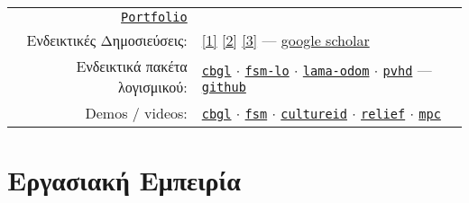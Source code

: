 \documentclass[a4paper,10pt,twoside]{article}
\begin{document}
\begin{tabular}{rp{12cm}}
  \href{https://raw.githubusercontent.com/li9i/portfolio/master/portfolio.pdf}{\texttt{Portfolio}} & \\

  Ενδεικτικές Δημοσιεύσεις:&
\href{https://ieeexplore.ieee.org/abstract/document/9981228}{[1]}
\href{https://www.sciencedirect.com/science/article/abs/pii/S0921889021002323}{[2]}
\href{https://www.tandfonline.com/doi/full/10.1080/00207179.2018.1514129}{[3]} --- \href{https://scholar.google.com/citations?view\_op=list\_works\&hl=en\&user=9\_hI4hMAAAAJ}{google scholar}\\

  Ενδεικτικά πακέτα λογισμικού: &
\href{https://github.com/li9i/cbgl}{\texttt{cbgl}} $\cdot$
\href{https://github.com/li9i/fsm-lo}{\texttt{fsm-lo}} $\cdot$
\href{https://github.com/li9i/lama-odom}{\texttt{lama-odom}} $\cdot$
\href{https://github.com/li9i/pandora\_vision\_2014/tree/hydro-devel/pandora\_vision\_hole\_detector}{\texttt{pvhd}} --- \href{https://github.com/li9i}{\texttt{github}}\\

  Demos / videos: & \href{https://www.youtube.com/watch?v=xaDKjI0WkDc}{\texttt{cbgl}} $\cdot$ \href{https://www.youtube.com/watch?v=hB4qsHCEXGI}{\texttt{fsm}} $\cdot$ \href{https://cultureid.web.auth.gr/?page\_id=200&lang=en}{\texttt{cultureid}} $\cdot$ \href{https://relief.web.auth.gr/}{\texttt{relief}} $\cdot$ \href{https://www.youtube.com/watch?v=937OZez1iN8}{\texttt{mpc}}
\end{tabular}


\section{Εργασιακή Εμπειρία}
\end{document}
